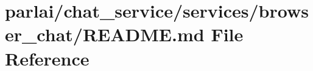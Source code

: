 \hypertarget{parlai_2chat__service_2services_2browser__chat_2README_8md}{}\section{parlai/chat\+\_\+service/services/browser\+\_\+chat/\+R\+E\+A\+D\+ME.md File Reference}
\label{parlai_2chat__service_2services_2browser__chat_2README_8md}
